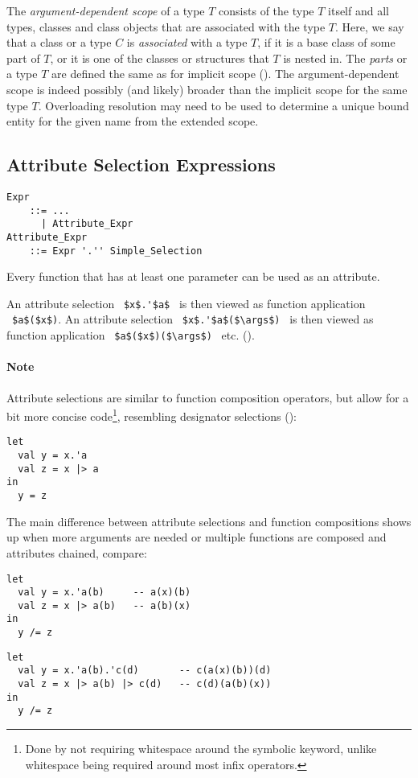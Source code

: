 The {\em argument-dependent scope} of a type $T$ consists of the type $T$ itself and all types, classes and class objects that are associated with the type $T$. Here, we say that a class or a type $C$ is {\em associated} with a type $T$, if it is a base class of some part of $T$, or it is one of the classes or structures that $T$ is nested in. The {\em parts} or a type $T$ are defined the same as for implicit scope (). The argument-dependent scope is indeed possibly (and likely) broader than the implicit scope for the same type $T$. Overloading resolution may need to be used to determine a unique bound entity for the given name from the extended scope. 





\subsection{Attribute Selection Expressions}
\label{sec:attribute-selection}

\grammar\begin{lstlisting}
Expr
    ::= ...
      | Attribute_Expr
Attribute_Expr 
    ::= Expr '.'' Simple_Selection
\end{lstlisting}

Every function that has at least one parameter can be used as an attribute. 

An attribute selection ~\lstinline!$x$.'$a$!~ is then viewed as function application ~\lstinline!$a$($x$)!. An attribute selection ~\lstinline!$x$.'$a$($\args$)!~ is then viewed as function application ~\lstinline!$a$($x$)($\args$)!~ etc. (). 

\paragraph{Note}
Attribute selections are similar to function composition operators, but allow for a bit more concise code\footnote{Done by not requiring whitespace around the symbolic keyword, unlike whitespace being required around most infix operators.}, resembling designator selections ():
\begin{lstlisting}
let 
  val y = x.'a 
  val z = x |> a 
in 
  y = z
\end{lstlisting}
The main difference between attribute selections and function compositions shows up when more arguments are needed or multiple functions are composed and attributes chained, compare: 
\begin{lstlisting}
let 
  val y = x.'a(b)     -- a(x)(b)
  val z = x |> a(b)   -- a(b)(x)
in
  y /= z
\end{lstlisting}
\begin{lstlisting}
let 
  val y = x.'a(b).'c(d)       -- c(a(x)(b))(d)
  val z = x |> a(b) |> c(d)   -- c(d)(a(b)(x))
in
  y /= z
\end{lstlisting}






